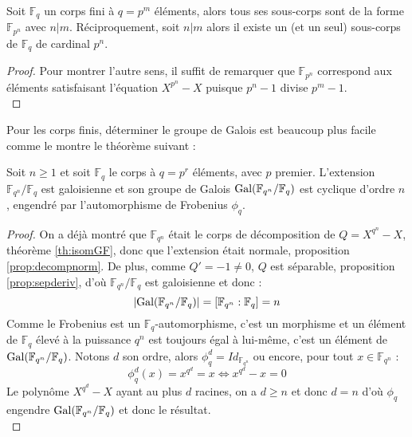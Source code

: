 \documentclass[a4paper]{article} %
\numberwithin{section}{part}
\numberwithin{equation}{section}
\newcommand\GF[1]{\mathbb{F}_{#1}}
\begin{document}
\begin{prop}
Soit $\GF{q}$ un corps fini à $q = p^m$ éléments, alors tous ses sous-corps sont
de la forme $\GF{p^n}$ avec $n|m$. Réciproquement, soit $n|m$ alors il existe un
(et un seul) sous-corps de $\GF{q}$ de cardinal $p^n$.
\end{prop}
\begin{proof}
Pour montrer l'autre sens, il suffit de remarquer que $\GF{p^n}$ correspond aux
éléments satisfaisant l'équation $X^{p^n} - X$ puisque $p^n - 1$ divise $p^m -
1$.\\
\end{proof}

Pour les corps finis, déterminer le groupe de Galois est beaucoup plus facile
comme le montre le théorème suivant :

\begin{thm}
Soit $n\geq1$ et soit $\GF{q}$ le corps à $q=p^r$ éléments, avec $p$ premier.
L'extension $\GF{q^n}/\GF{q}$ est galoisienne et son groupe de Galois
$\textup{Gal}(\GF{q^n}/\GF{q})$ est cyclique d'ordre $n$, engendré par 
l'automorphisme de Frobenius $\phi_q$.
\end{thm}
\begin{proof}
On a déjà montré que $\GF{q^n}$ était le corps de décomposition de $Q = X^{q^n} 
- X$, théorème \ref{th:isomGF}, donc que l'extension était normale, proposition 
\ref{prop:decompnorm}. De plus, comme $Q' = -1 \neq 0$, $Q$ est séparable,
proposition \ref{prop:sepderiv}, d'où $\GF{q^n}/\GF{q}$ est galoisienne
et donc :
\[|\textup{Gal}(\GF{q^n}/\GF{q})| = [\GF{q^n}:\GF{q}] = n\]
Comme le Frobenius est un $\GF{q}$-automorphisme, c'est un morphisme et un 
élément de $\GF{q}$ élevé à la puissance $q^n$ est toujours égal à lui-même, 
c'est un élément de $\textup{Gal}(\GF{q^n}/\GF{q})$. Notons $d$ son ordre, alors
$\phi_q^d = Id_{\GF{q^n}}$ ou encore, pour tout $x\in\GF{q^n}$ :
\[\phi_q^d(x) = x^{q^d} = x \Leftrightarrow x^{q^d} - x = 0\]
Le polynôme $X^{q^d} - X$ ayant au plus $d$ racines, on a $d\geq n$ et donc $d =
n$ d'où $\phi_q$ engendre $\textup{Gal}(\GF{q^n}/\GF{q})$ et donc le
résultat.\\
\end{proof}
\end{document}
